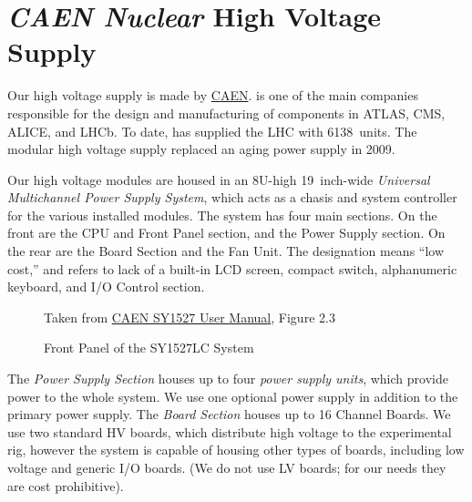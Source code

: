 
\chapter{\textit{CAEN Nuclear} High Voltage Supply}
\label{chap:eq_high_voltage}

Our high voltage supply is made by \href{http://www.caen.it/}{CAEN}.   is one of the main companies responsible for the design and manufacturing of components in ATLAS, CMS, ALICE, and LHCb.  To date,  has supplied the LHC with 6138~units.  The modular  high voltage supply replaced an aging power supply in 2009.  %

Our high voltage modules are housed in an 8U-high 19~inch-wide  \textit{Universal Multichannel Power Supply System}, which acts as a chasis and system controller for the various installed modules.  The  system has four main sections.  On the front are the CPU and Front Panel section, and the Power Supply section.  On the rear are the Board Section and the Fan Unit.  The  designation means ``low cost,'' and refers to lack of a built-in LCD screen, compact switch, alphanumeric keyboard, and I/O Control section.  

\begin{figure}[htbp]
  \centering
  {
    \tiny Taken from \href{Manuals/CAEN sy1527usermanual_rev15}{CAEN SY1527 User Manual}, Figure 2.3
  }
  \caption{Front Panel of the SY1527LC System}
  \label{fig:eq_high_voltage:chasis_front}
\end{figure}

The \textit{Power Supply Section} houses up to four \textit{power supply units}, which provide power to the whole system.  We use one optional power supply in addition to the primary power supply.  The \textit{Board Section} houses up to 16 Channel Boards.  We use two standard HV boards, which distribute high voltage to the experimental rig, however the system is capable of housing other types of boards, including low voltage and generic I/O boards.  (We do not use  LV boards; for our needs they are cost prohibitive).

